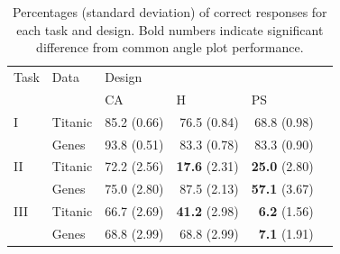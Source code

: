 \documentclass[journal]{vgtc}\usepackage{graphicx, color}
\begin{document}
%
\begin{table}[ht]
\begin{center}
\begin{tabular}{llrrrr}
  \hline
Task & Data & \multicolumn{3}{l}{Design} \\
& & \multicolumn{1}{l}{CA} & \multicolumn{1}{l}{H}  & \multicolumn{1}{l}{PS}  \\ 
  \hline
 I & Titanic & 85.2 (0.66) & 76.5 (0.84) & 68.8 (0.98) \\ 
& Genes & 93.8 (0.51) & 83.3 (0.78) & 83.3 (0.90) \\ [3pt]
 II& Titanic & 72.2 (2.56) & {\bf 17.6} (2.31) & {\bf 25.0} (2.80) \\ 
& Genes & 75.0 (2.80) & 87.5 (2.13) & {\bf 57.1} (3.67) \\ [3pt]
III & Titanic & 66.7 (2.69) & {\bf 41.2} (2.98) & {\bf 6.2} (1.56) \\ 
& Genes & 68.8 (2.99) & 68.8 (2.99) & {\bf 7.1} (1.91) \\ \hline
\end{tabular}
\end{center}
\caption{\label{raw} Percentages (standard deviation) of correct responses for each task and design. Bold numbers indicate significant difference from common angle plot performance.  }
\end{table}
\end{document}
